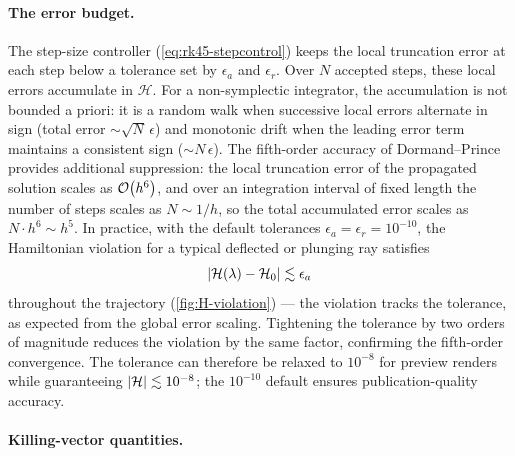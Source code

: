 \paragraph{The error budget.}

The step-size controller (\cref{eq:rk45-stepcontrol}) keeps the local
truncation error at each step below a tolerance set by $\epsilon_a$
and $\epsilon_r$.  Over $N$ accepted steps, these local errors
accumulate in $\mathcal{H}$.  For a non-symplectic integrator, the
accumulation is not bounded a priori: it is a random walk when
successive local errors alternate in sign (total error
$\sim \sqrt{N}\,\epsilon$) and monotonic drift when the leading error
term maintains a consistent sign ($\sim N\,\epsilon$).  The
fifth-order accuracy of Dormand--Prince provides additional
suppression: the local truncation error of the propagated solution
scales as $\mathcal{O}\!\left(h^6\right)$, and over an integration interval of fixed
length the number of steps scales as $N \sim 1/h$, so the total
accumulated error scales as $N \cdot h^6 \sim h^5$.  In practice,
with the default tolerances
$\epsilon_a = \epsilon_r = 10^{-10}$, the Hamiltonian violation
for a typical deflected or plunging ray satisfies
%
\begin{equation}
  \left\lvert \mathcal{H}(\lambda) - \mathcal{H}_0 \right\rvert
  \lesssim \epsilon_a
  \label{eq:H-violation-bound}
\end{equation}
%
throughout the trajectory (\cref{fig:H-violation}) --- the violation
tracks the tolerance, as expected from the global error scaling.
Tightening the tolerance by two orders of magnitude reduces the
violation by the same factor, confirming the fifth-order convergence.
The tolerance can therefore be relaxed to $10^{-8}$ for preview
renders while guaranteeing $\left\lvert \mathcal{H} \right\rvert \lesssim 10^{-8}$;
the $10^{-10}$ default ensures publication-quality accuracy.

\paragraph{Killing-vector quantities.}

